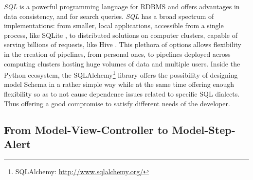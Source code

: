 \documentclass[final,5p,times,twocolumn,authoryear]{elsarticle}
\begin{document}
\textit{SQL} is a powerful programming language for RDBMS and offers advantages in data consistency, and for search queries.
%
\textit{SQL} has a broad spectrum of implementations: from smaller,
local applications, accessible from a single process, like SQLite \citep{owens2010sqlite},
to distributed solutions on computer clusters, capable of serving billions of
requests, like Hive \citep{thusoo2009hive}.
%
This plethora of options allows flexibility in the creation of pipelines,
from personal ones, to pipelines deployed across computing clusters hosting
huge volumes of data and multiple users.
%
Inside the Python ecosystem, the SQLAlchemy\footnote{SQLAlchemy: \url{http://www.sqlalchemy.org/}} library offers
the possibility of designing model Schema in a rather simple way while at the same time offering enough flexibility so as to not cause dependence issues related to specific SQL dialects. Thus offering a good compromise to satisfy different needs of the developer.

\subsection{From Model-View-Controller to Model-Step-Alert}
\end{document}
